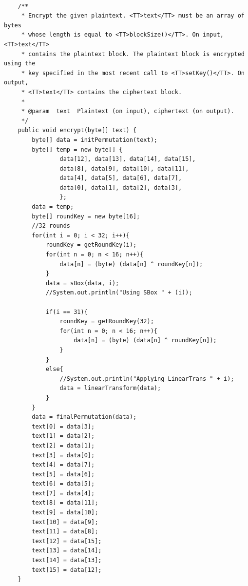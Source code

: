 \documentclass[12pt]{article} %
\begin{document}
\begin{lstlisting}
    
    /**
     * Encrypt the given plaintext. <TT>text</TT> must be an array of bytes
     * whose length is equal to <TT>blockSize()</TT>. On input, <TT>text</TT>
     * contains the plaintext block. The plaintext block is encrypted using the
     * key specified in the most recent call to <TT>setKey()</TT>. On output,
     * <TT>text</TT> contains the ciphertext block.
     *
     * @param  text  Plaintext (on input), ciphertext (on output).
     */
    public void encrypt(byte[] text) {
        byte[] data = initPermutation(text);
        byte[] temp = new byte[] {
                data[12], data[13], data[14], data[15],
                data[8], data[9], data[10], data[11],
                data[4], data[5], data[6], data[7],
                data[0], data[1], data[2], data[3],
                };
        data = temp;
        byte[] roundKey = new byte[16];
        //32 rounds
        for(int i = 0; i < 32; i++){
            roundKey = getRoundKey(i);
            for(int n = 0; n < 16; n++){
                data[n] = (byte) (data[n] ^ roundKey[n]);
            }
            data = sBox(data, i);
            //System.out.println("Using SBox " + (i));
            
            if(i == 31){
                roundKey = getRoundKey(32);
                for(int n = 0; n < 16; n++){
                    data[n] = (byte) (data[n] ^ roundKey[n]);
                } 
            }
            else{
                //System.out.println("Applying LinearTrans " + i);
                data = linearTransform(data);
            }
        }
        data = finalPermutation(data);   
        text[0] = data[3];
        text[1] = data[2];
        text[2] = data[1];
        text[3] = data[0];
        text[4] = data[7];
        text[5] = data[6];
        text[6] = data[5];
        text[7] = data[4];
        text[8] = data[11];
        text[9] = data[10];
        text[10] = data[9];
        text[11] = data[8];
        text[12] = data[15];
        text[13] = data[14];
        text[14] = data[13];
        text[15] = data[12];
    }


\end{lstlisting}
\end{document}
